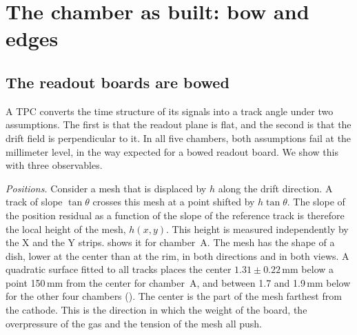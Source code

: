 \section{The chamber as built: bow and edges}\label{sec:asbuilt}

\subsection{The readout boards are bowed}\label{sec:bow}
A TPC converts the time structure of its signals into a track angle under two assumptions. The first is that the
readout plane is flat, and the second is that the drift field is perpendicular to it. In all five chambers, both
assumptions fail at the millimeter level, in the way expected for a bowed readout board. We show this with three
observables.

\emph{Positions.} Consider a mesh that is displaced by $h$ along the drift direction. A track of slope $\tan\theta$
crosses this mesh at a point shifted by $h\tan\theta$. The slope of the position residual as a function of the slope
of the reference track is therefore the local height of the mesh, $h(x,y)$. This height is measured independently by
the X and the Y strips.  shows it for chamber~A. The mesh has the shape of a dish, lower at the
center than at the rim, in both directions and in both views. A quadratic surface fitted to all tracks places the
center $1.31\pm0.22$\,mm below a point 150\,mm from the center for chamber~A, and between 1.7 and 1.9\,mm below for
the other four chambers (). The center is the part of the mesh farthest from the cathode. This is the
direction in which the weight of the board, the overpressure of the gas and the tension of the mesh all push.

